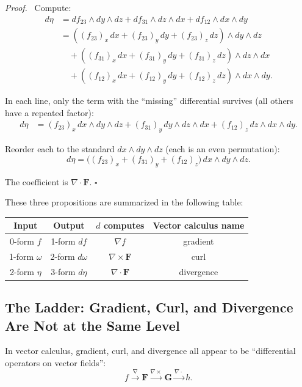 \documentclass[11pt]{report}
\renewenvironment{proof}[1][Proof]{\par\noindent\textit{#1.}\ }{\hfill$\square$\par\medskip}
\begin{document}
\begin{proof}
Compute:
\begin{align*}
d\eta &= df_{23} \wedge dy \wedge dz + df_{31} \wedge dz \wedge dx + df_{12} \wedge dx \wedge dy \\
&= ((f_{23})_x \, dx + (f_{23})_y \, dy + (f_{23})_z \, dz) \wedge dy \wedge dz \\
&\quad + ((f_{31})_x \, dx + (f_{31})_y \, dy + (f_{31})_z \, dz) \wedge dz \wedge dx \\
&\quad + ((f_{12})_x \, dx + (f_{12})_y \, dy + (f_{12})_z \, dz) \wedge dx \wedge dy.
\end{align*}

In each line, only the term with the ``missing'' differential survives (all others have a repeated factor):
\begin{align*}
d\eta &= (f_{23})_x \, dx \wedge dy \wedge dz + (f_{31})_y \, dy \wedge dz \wedge dx + (f_{12})_z \, dz \wedge dx \wedge dy.
\end{align*}

Reorder each to the standard $dx \wedge dy \wedge dz$ (each is an even permutation):
\[
d\eta = \big((f_{23})_x + (f_{31})_y + (f_{12})_z\big) \, dx \wedge dy \wedge dz.
\]

The coefficient is $\nabla \cdot \mathbf{F}$.
\end{proof}

These three propositions are summarized in the following table:
\begin{center}
\renewcommand{\arraystretch}{1.5}
\begin{tabular}{|c|c|c|c|}
\hline
\textbf{Input} & \textbf{Output} & \textbf{$d$ computes} & \textbf{Vector calculus name} \\
\hline
0-form $f$ & 1-form $df$ & $\nabla f$ & gradient \\
\hline
1-form $\omega$ & 2-form $d\omega$ & $\nabla \times \mathbf{F}$ & curl \\
\hline
2-form $\eta$ & 3-form $d\eta$ & $\nabla \cdot \mathbf{F}$ & divergence \\
\hline
\end{tabular}
\end{center}

\subsection*{The Ladder: Gradient, Curl, and Divergence Are Not at the Same Level}

In vector calculus, gradient, curl, and divergence all appear to be ``differential operators on vector fields'':
\[
f \xrightarrow{\nabla} \mathbf{F} \xrightarrow{\nabla\times} \mathbf{G} \xrightarrow{\nabla\cdot} h.
\]
\end{document}
